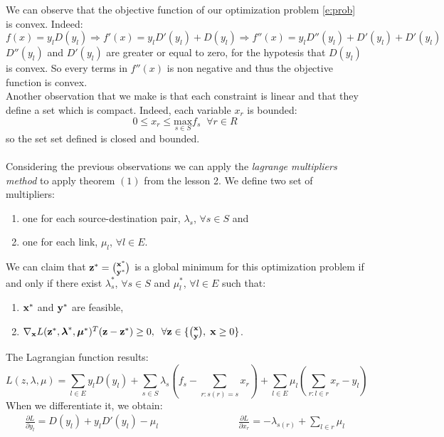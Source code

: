 We can observe that the objective function of our optimization problem \eqref{e:prob} is convex. Indeed:
\begin{equation}
f(x) = y_l D(y_l) \Rightarrow f'(x) = y_l D'(y_l) + D(y_l) \Rightarrow f''(x) = y_l D''(y_l) + D'(y_l) + D'(y_l)
\end{equation}
$D''(y_l)$ and $ D'(y_l)$ are greater or equal to zero, for the hypotesis that $ D(y_l)$ is convex. So every terms in $f''(x)$ is non negative and thus the objective function is convex.\\
Another observation that we make is that each constraint is linear and that they define a set which is compact. Indeed, each variable $x_r$ is bounded:
\begin{equation}
0 \leq x_r \leq \underset{s \in S}{\text{max}} {f_s} \;\; \forall r \in R
\end{equation}
so the set set defined is closed and bounded.\\\\
Considering the previous observations we can apply the \emph{lagrange multipliers method} to apply theorem $(1)$ from the lesson 2. We define two set of multipliers:
\begin{enumerate}
\item one for each source-destination pair, $\lambda_s$, $ \forall s \in S$ and
\item one for each link, $\mu_l$, $\forall l \in E$.
\end{enumerate}
We can claim that  $\mathbf{z}^* = {\mathbf{x}^* \choose \mathbf{y}^*}$ is a global minimum for this optimization problem if and only if there exist $\lambda_s^*$, $\forall s \in S$ and $\mu_l^*$, $\forall l \in E$ such that:
\begin{enumerate}
\item $\mathbf{x}^*$ and $\mathbf{y}^*$ are feasible,
\item $\nabla_{\mathbf{x}} L(\mathbf{z}^*,\boldsymbol{\lambda}^*,\boldsymbol{\mu}^*)^T (\mathbf{z} - \mathbf{z}^*) \ge 0,  \;\; \forall \mathbf{z} \in \{{\mathbf{x} \choose \mathbf{y}} ,\; \mathbf{x} \ge 0  \}$.
\end{enumerate}
The Lagrangian function results:
\begin{equation} 
L(z,\lambda,\mu)= \sum_{l \in E}  y_l D(y_l) + \sum_{s \in S} \lambda_{s} \left(f_s - \sum_{r:s(r)=s} x_r\right) + \sum_{l \in E} \mu_l \left(\sum_{r:l \in r} x_r - y_l\right) 
\end{equation}
When we differentiate it, we obtain:
\begin{equation}
\begin{aligned}
\frac{\partial L}{\partial y_l}=D(y_l)+  y_l D'(y_l) -  \mu_l  &&&&& &&&&& \frac{\partial L}{\partial x_r}=- \lambda_{s(r)} + \sum_{l \in r} \mu_l
\end{aligned}
\end{equation}
